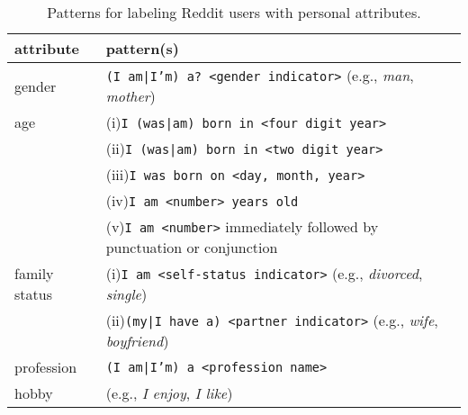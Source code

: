 \begin{table*}[t!]
\centering
\begin{adjustbox}{width=0.88\textwidth}
\begin{tabularx}{\linewidth}{ll}
\toprule
\textbf{attribute} & \textbf{pattern(s)} \\
\midrule
gender & \texttt{\footnotesize (I am|I'm) a? <gender indicator>} {\footnotesize(e.g., \emph{man}, \emph{mother})} \\ [0.8ex] 
age & (i)\quad \texttt{\footnotesize I (was|am) born in <four digit year>} \\ 
 & (ii)\quad \texttt{\footnotesize I (was|am) born in <two digit year>} \\
 & (iii)\quad \texttt{\footnotesize I was born on <day, month, year>} \\
 & (iv)\quad \texttt{\footnotesize I am <number> years old} \\
 & (v)\quad \texttt{\footnotesize I am <number>} {\footnotesize immediately followed  by punctuation or conjunction} \\ [0.8ex]
family status & (i)\quad \texttt{\footnotesize I am <self-status indicator>} {\footnotesize (e.g., \textit{divorced}, \textit{single})} \\
 & (ii)\quad \texttt{\footnotesize (my|I have a) <partner indicator>} ({\footnotesize e.g., \textit{wife}, \textit{boyfriend})} \\ [0.8ex]
profession & \texttt{\footnotesize (I am|I'm) a <profession name>} \\ [0.8ex]
hobby & \texttt{} {\footnotesize (e.g., \textit{I enjoy}, \textit{I like})} \texttt{} \\ [0.8ex]
\bottomrule
\end{tabularx}
\end{adjustbox}
\caption{Patterns for labeling Reddit users with personal attributes.}
\label{pat_table}
\end{table*}



